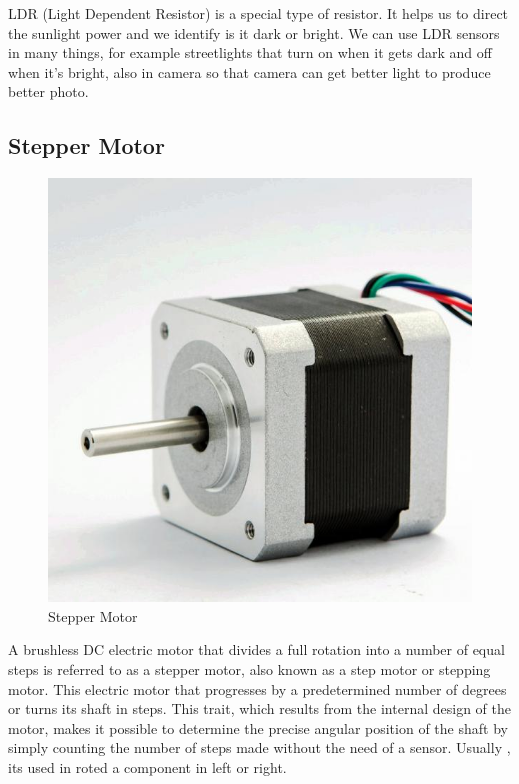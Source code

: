 \documentclass[conference]{IEEEtran}
\begin{document}
LDR (Light Dependent Resistor) is a special type of resistor. It helps us to direct the sunlight power and we identify is it dark or bright. We can use LDR sensors in many things, for example streetlights that turn on when it gets dark and off when it's bright, also in camera so that camera can get better light to produce better photo.
 

\subsection{Stepper Motor}
\begin{figure}
    \centering
    \includegraphics[width=0.5\linewidth]{Stepper Motor.png}
    \caption{Stepper Motor}
    \label{fig:enter-label}
\end{figure}

A brushless DC electric motor that divides a full rotation into a number of equal steps is referred to as a stepper motor, also known as a step motor or stepping motor. This electric motor that progresses by a predetermined number of degrees or turns its shaft in steps.
This trait, which results from the internal design of the motor, makes it possible to determine the precise angular position of the shaft by simply counting the number of steps made without the need of a sensor. Usually , its used in roted a component in left or right.
\end{document}
